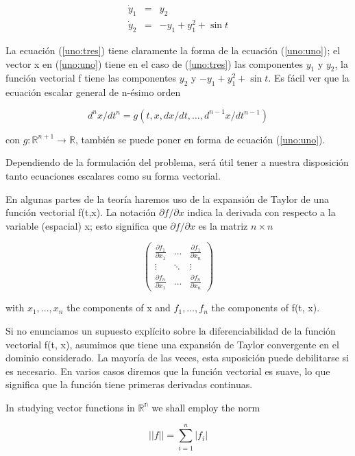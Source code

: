 \documentclass{beamer}
\begin{document}
\begin{frame}

\begin{equation} \label{uno:tres}
\begin{array}{rcl}
\dot{y}_1 & = & y_2 \\
\dot{y}_2 & = & -y_1 + y^2_1 + \sin t
\end{array}
\end{equation}

La ecuación (\ref{uno:tres}) tiene claramente la forma de la ecuación (\ref{uno:uno}); el vector x en (\ref{uno:uno}) tiene en el caso de (\ref{uno:tres}) las componentes $y_1$ y $y_2$, la función vectorial f tiene las componentes $y_2$ y $-y_1 + y^2_1 + \sin t$. Es fácil ver que la ecuación escalar general de n-ésimo orden

\[
d^n x / dt^n = g(t, x, dx/dt, …, d^{n-1} x / dt^{n-1})
\]

con $g: \mathbb{R}^{n+1} \rightarrow \mathbb{R}$, también se puede poner en forma de ecuación (\ref{uno:uno}).

Dependiendo de la formulación del problema, será útil tener a nuestra disposición tanto ecuaciones escalares como su forma vectorial.


\end{frame}

\begin{frame}
En algunas partes de la teoría haremos uso de la expansión de Taylor de una función vectorial f(t,x). La notación $\partial f / \partial x$ indica la derivada con respecto a la variable (espacial) x; esto significa que $\partial f / \partial x$ es la matriz $n \times n$

\[
\begin{pmatrix}
\frac{\partial f_1}{\partial x_1} & ... & \frac{\partial f_1}{\partial x_n}\\ 
 \vdots & \ddots & \vdots \\ 
\frac{\partial f_n}{\partial x_1} & ... & \frac{\partial f_n}{\partial x_n}
\end{pmatrix}
\]

with $x_1, ... ,x_n$ the components of x and $f_1, … , f_n$ the components of f(t, x).

\end{frame}

\begin{frame}
Si no enunciamos un supuesto explícito sobre la diferenciabilidad de la función vectorial f(t, x), asumimos que tiene una expansión de Taylor convergente en el dominio considerado. La mayoría de las veces, esta suposición puede debilitarse si es necesario. En varios casos diremos que la función vectorial es suave, lo que significa que la función tiene primeras derivadas continuas.

In studying vector functions in $\mathbb{R^n}$ we shall employ the norm

\[
||f|| = \sum_{i=1}^n |f_i|
\]

\end{frame}
\end{document}
